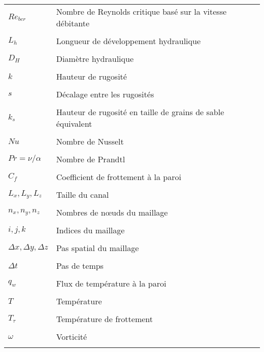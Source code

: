 \begin{center}
\begin{tabular}{ m{3cm} m{11.5cm} m{1cm} }
$Re_{bcr}$ & Nombre de Reynolds critique basé sur la vitesse débitante &  \\
\\[-2.625em]
$L_{h}$ & Longueur de développement hydraulique &  \\
\\[-2.625em]
$D_{H}$ & Diamètre hydraulique &  \\
\\[-2.625em]
$k$ & Hauteur de rugosité &  \\
\\[-2.625em]
$s$ & Décalage entre les rugosités &  \\
\\[-2.625em]
$k_{s}$ & Hauteur de rugosité en taille de grains de sable équivalent &  \\
\\[-2.625em]
$Nu$ & Nombre de Nusselt &  \\
\\[-2.625em]
$Pr=\nu/\alpha$ & Nombre de Prandtl &  \\
\\[-2.625em]
$C_{f}$ & Coefficient de frottement à la paroi &  \\
\\[-2.625em]
$L_{x}, L_{y}, L_{z}$ & Taille du canal &  \\
\\[-2.625em]
$n_{x}, n_{y}, n_{z}$ & Nombres de nœuds du maillage &  \\
\\[-2.625em]
$i, j, k$ & Indices du maillage &  \\
\\[-2.625em]
$\Delta x, \Delta y, \Delta z$ & Pas spatial du maillage &  \\
\\[-2.625em]
$\Delta t$ & Pas de temps &  \\
\\[-2.625em]
$q_{w}$ & Flux de température à la paroi &  \\
\\[-2.625em]
$T$ & Température &  \\
\\[-2.625em]
$T_{\tau}$ & Température de frottement &  \\
\\[-2.625em]
$\omega$ & Vorticité &  \\
\\[-2.625em]
\end{tabular}
\end{center}

